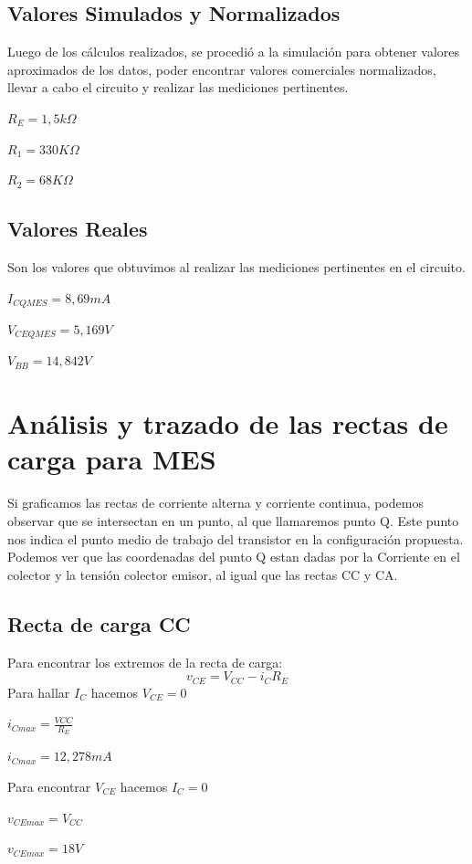\documentclass[12pt]{article}
\begin{document}
\subsection{Valores Simulados y Normalizados}
Luego de los cálculos realizados, se procedió a la simulación para obtener valores aproximados de los datos, poder encontrar valores comerciales normalizados, llevar a cabo el circuito y realizar las mediciones pertinentes.
\begin{center}
 $R_E=1,5k\Omega$

 $R_1=330K\Omega$
 
 $R_2=68K\Omega$

 \end{center}

 
 



\subsection{Valores Reales}
Son los valores que obtuvimos al realizar las mediciones pertinentes en el circuito.
\begin{center}
  $I_{CQMES}=8,69mA$
  
  $V_{CEQMES}=5,169V$
  
  $V_{BB}=14,842V$
  

\end{center}

\section{Análisis y trazado de las rectas de carga para MES}
Si graficamos las rectas de corriente alterna y corriente continua, podemos observar que se intersectan en un punto, al que llamaremos punto Q. Este punto nos indica el punto medio de trabajo del transistor en la configuración propuesta. Podemos ver que las coordenadas del punto Q estan dadas por la Corriente en el colector y la tensión colector emisor, al igual que las rectas CC y CA.

\subsection{Recta de carga CC}
Para encontrar los extremos de la recta de carga:
\begin{equation}
  v_{CE}=V_{CC}-i_{C}R_E
\end{equation}
Para hallar $I_{C}$ hacemos $V_{CE}=0$
\begin{center}
  $i_{C max}=\frac{V{CC}}{R_E}$
  
  $i_{C max}=12,278mA$
\end{center}
Para encontrar $V_{CE}$ hacemos $I_C=0$
\begin{center}
  $v_{CE max}=V_{CC}$
  
  $v_{CE max}=18V$
\end{center}
\end{document}
